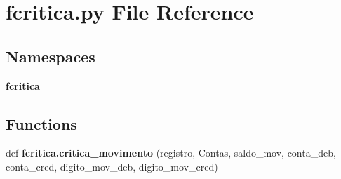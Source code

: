 \section{fcritica.\+py File Reference}
\label{fcritica_8py}
\subsection*{Namespaces}
\begin{DoxyCompactItemize}
\item 
 \textbf{ fcritica}
\end{DoxyCompactItemize}
\subsection*{Functions}
\begin{DoxyCompactItemize}
\item 
def \textbf{ fcritica.\+critica\+\_\+movimento} (registro, Contas, saldo\+\_\+mov, conta\+\_\+deb, conta\+\_\+cred, digito\+\_\+mov\+\_\+deb, digito\+\_\+mov\+\_\+cred)
\end{DoxyCompactItemize}
